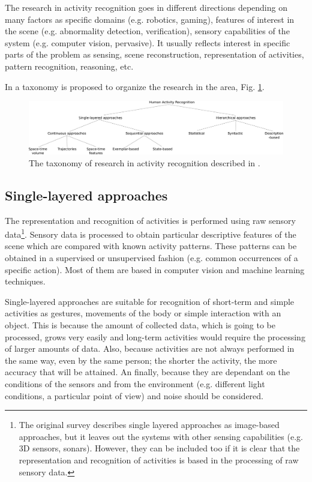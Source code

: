 \documentclass[a4paper, 12pt, openany, oneside]{book}
\begin{document}
The research in activity recognition goes in different directions depending on many factors as specific domains (e.g. robotics, gaming), features of interest in the scene (e.g. abnormality detection, verification), sensory capabilities of the system (e.g. computer vision, pervasive). It usually reflects interest in specific parts of the problem as sensing, scene reconstruction, representation of activities, pattern recognition, reasoning, etc.

In \citep{Aggarwal11_HumanActivity} a taxonomy is proposed to organize the research in the area, Fig. \ref{fig:taxonomy}.  

\begin{figure}[h]
\centering
\includegraphics[width=\textwidth]{fig/img_Aggarwal_Taxonomy.pdf}
\caption{The taxonomy of research in activity recognition described in \cite{Aggarwal11_HumanActivity}.}
\label{fig:taxonomy}
\end{figure}

\subsection{Single-layered approaches}
The representation and recognition of activities is performed using raw sensory data\footnote{The original survey \citep{Aggarwal11_HumanActivity} describes single layered approaches as image-based approaches, but it leaves out the systems with other sensing capabilities (e.g. 3D sensors, sonars). 
However, they can be included too if it is clear that the representation and recognition of activities is based in the processing of raw sensory data.}. 
Sensory data is processed to obtain particular descriptive features of the scene which are compared with known activity patterns. 
These patterns can be obtained in a supervised or unsupervised fashion (e.g. common occurrences of a specific action). 
Most of them are based in computer vision and machine learning techniques.

Single-layered approaches are suitable for recognition of short-term and simple activities as gestures, movements of the body or simple interaction with an object. 
This is because the amount of collected data, which is going to be processed, grows very easily and long-term activities would require the processing of larger amounts of data. 
Also, because activities are not always performed in the same way, even by the same person; the shorter the activity, the more accuracy that will be attained.  
An finally, because they are dependant on the conditions of the sensors and from the environment (e.g. different light conditions, a particular point of view) and noise should be considered.
\end{document}
